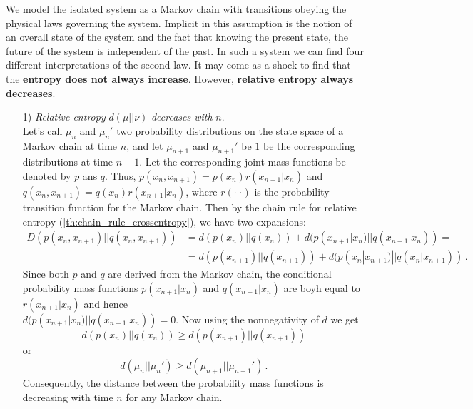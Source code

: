 We model the isolated system as a Markov chain with transitions obeying the physical laws governing the system. Implicit in this assumption is
the notion of an overall state of the system and the fact that knowing the
present state, the future of the system is independent of the past. In such
a system we can find four different interpretations of the second law. It
may come as a shock to find that the \textbf{entropy does not always increase}.
However, \textbf{relative entropy always decreases}.
\begin{itemize}
    \item[1)] \textit{Relative entropy} $d(\mu || \nu)$ \textit{decreases with} $n$. 
    \\Let's call $\mu_n$ and $\mu_n'$ two probability distributions on the state space of a Markov chain at time $n$, and let $\mu_{n+1}$ and $\mu_{n+1}'$ be $1$ be the corresponding distributions at time $n + 1$. Let the corresponding joint mass functions be denoted by $p$ ans $q$. Thus, $p(x_n, x_{n+1}) = p(x_n) r(x_{n+1}|x_n)$ and $q(x_n, x_{n+1}) = q(x_n) r(x_{n+1}|x_n)$, where $r(\cdot|\cdot)$ is the probability transition function for the Markov chain. Then by the chain rule for relative entropy (\ref{th:chain_rule_crossentropy}), we have two expansions:
    \begin{align*}
        D(p(x_n, x_{n+1}) || q(x_n, x_{n+1}))& =  d(p(x_n) || q(x_n)) + d(p(x_{n+1}| x_n) || q(x_{n+1}| x_n)) = \\& =  d(p(x_{n+1}) || q(x_{n+1})) + d(p(x_n| x_{n+1}) || q(x_n| x_{n+1}) ) \, .
    \end{align*}
    Since both $p$ and $q$ are derived from the Markov chain, the conditional probability mass functions $p(x_{n+1}| x_n)$ and $q(x_{n+1}| x_n)$ are boyh equal to $r(x_{n+1}|x_n)$ and hence\\ $d( p(x_{n+1}| x_n) || q(x_{n+1}| x_n) ) = 0$. Now using the nonnegativity of $d$ we get 
    \begin{equation*}
        d(p(x_n) || q(x_n)) \geq d(p(x_{n+1}) || q(x_{n+1}))
    \end{equation*}
    or
    \begin{equation}
    \label{eq:decrease_of_d}
        d(\mu_n || \mu_n') \geq d(\mu_{n+1} || \mu_{n+1}') \, .
    \end{equation}
    Consequently, the distance between the probability mass functions
    is decreasing with time $n$ for any Markov chain.
    

\end{itemize}
